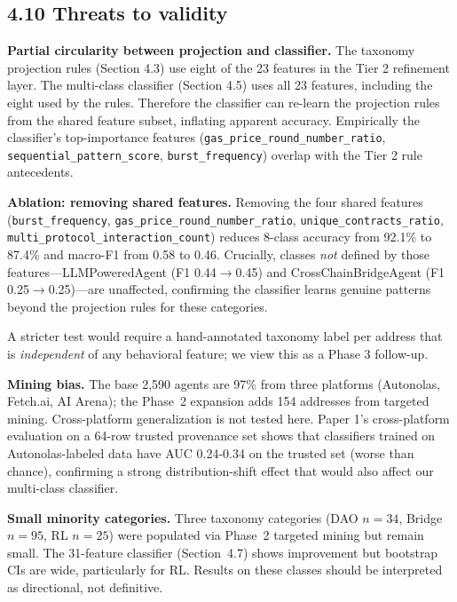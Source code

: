 \documentclass[sigconf,nonacm=false]{acmart}
\begin{document}
\subsection{4.10 Threats to validity}

\textbf{Partial circularity between projection and classifier.} The taxonomy projection rules (Section 4.3) use eight of the 23 features in the Tier 2 refinement layer. The multi-class classifier (Section 4.5) uses all 23 features, including the eight used by the rules. Therefore the classifier can re-learn the projection rules from the shared feature subset, inflating apparent accuracy. Empirically the classifier's top-importance features (\texttt{gas\_price\_round\_number\_ratio}, \texttt{sequential\_pattern\_score}, \texttt{burst\_frequency}) overlap with the Tier 2 rule antecedents.

\textbf{Ablation: removing shared features.} Removing the four shared features (\texttt{burst\_frequency}, \texttt{gas\_price\_round\_number\_ratio}, \texttt{unique\_contracts\_ratio}, \texttt{multi\_protocol\_interaction\_count}) reduces 8-class accuracy from 92.1\% to 87.4\% and macro-F1 from 0.58 to 0.46. Crucially, classes \emph{not} defined by those features---LLMPoweredAgent (F1 0.44$\to$0.45) and CrossChainBridgeAgent (F1 0.25$\to$0.25)---are unaffected, confirming the classifier learns genuine patterns beyond the projection rules for these categories.

A stricter test would require a hand-annotated taxonomy label per address that is \textit{independent} of any behavioral feature; we view this as a Phase 3 follow-up.

\textbf{Mining bias.} The base 2,590 agents are 97\% from three platforms (Autonolas, Fetch.ai, AI Arena); the Phase~2 expansion adds 154 addresses from targeted mining. Cross-platform generalization is not tested here. Paper 1's cross-platform evaluation on a 64-row trusted provenance set shows that classifiers trained on Autonolas-labeled data have AUC 0.24-0.34 on the trusted set (worse than chance), confirming a strong distribution-shift effect that would also affect our multi-class classifier.

\textbf{Small minority categories.} Three taxonomy categories (DAO $n{=}34$, Bridge $n{=}95$, RL $n{=}25$) were populated via Phase~2 targeted mining but remain small. The 31-feature classifier (Section~4.7) shows improvement but bootstrap CIs are wide, particularly for RL. Results on these classes should be interpreted as directional, not definitive.
\end{document}
